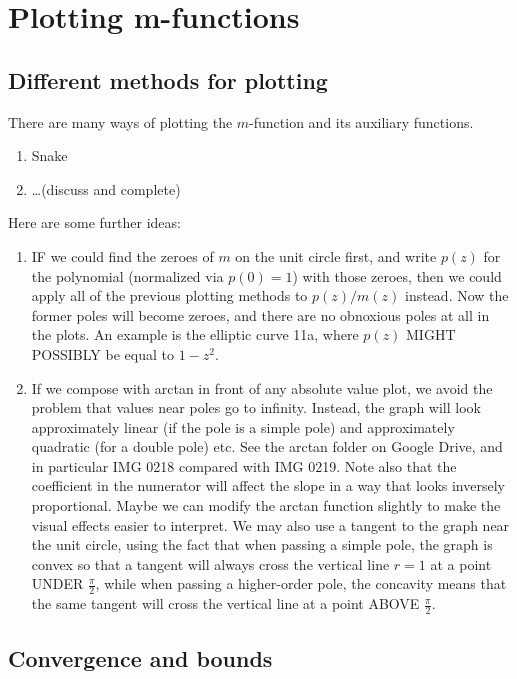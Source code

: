 \documentclass[a4paper]{amsart}
\begin{document}
\section{Plotting m-functions}


\subsection{Different methods for plotting}

There are many ways of plotting the $m$-function and its auxiliary functions.

\begin{enumerate}
\item Snake
\item \ldots (discuss and complete)
\end{enumerate}

Here are some further ideas:

\begin{enumerate}
\item IF we could find the zeroes of $m$ on the unit circle first, and write $p(z)$ for the polynomial (normalized via $p(0) = 1$) with those zeroes, then we could apply all of the previous plotting methods to $p(z)/m(z)$ instead. Now the former poles will become zeroes, and there are no obnoxious poles at all in the plots. An example is the elliptic curve 11a, where $p(z)$ MIGHT POSSIBLY be equal to $1-z^2$.
\item If we compose with arctan in front of any absolute value plot, we avoid the problem that values near poles go to infinity. Instead, the graph will look approximately linear (if the pole is a simple pole) and approximately quadratic (for a double pole) etc. See the arctan folder on Google Drive, and in particular IMG 0218 compared with IMG 0219. Note also that the coefficient in the numerator will affect the slope in a way that looks inversely proportional. Maybe we can modify the arctan function slightly to make the visual effects easier to interpret. We may also use a tangent to the graph near the unit circle, using the fact that when passing a simple pole, the graph is convex so that a tangent will always cross the vertical line $r=1$ at a point UNDER $\frac{\pi}{2}$, while when passing a higher-order pole, the concavity means that the same tangent will cross the vertical line at a point ABOVE $\frac{\pi}{2}$.
\end{enumerate}



\subsection{Convergence and bounds}
\end{document}
